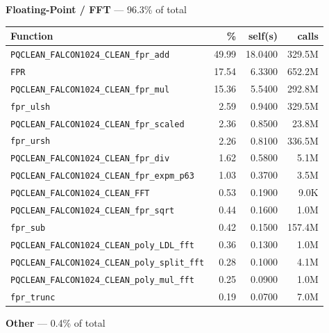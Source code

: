 \documentclass[11pt,a4paper]{article}
\begin{document}
\noindent\colorbox{fpcolor}{\strut \textbf{Floating-Point / FFT} --- 96.3\% of total}
\vspace{2pt}

\begin{longtable}{p{7.5cm}rrr}
\toprule
Function & \% & self(s) & calls \\
\midrule
\endhead
  \texttt{PQCLEAN\_FALCON1024\_CLEAN\_fpr\_add} & 49.99 & 18.0400 & 329.5M \\
  \texttt{FPR} & 17.54 & 6.3300 & 652.2M \\
  \texttt{PQCLEAN\_FALCON1024\_CLEAN\_fpr\_mul} & 15.36 & 5.5400 & 292.8M \\
  \texttt{fpr\_ulsh} & 2.59 & 0.9400 & 329.5M \\
  \texttt{PQCLEAN\_FALCON1024\_CLEAN\_fpr\_scaled} & 2.36 & 0.8500 & 23.8M \\
  \texttt{fpr\_ursh} & 2.26 & 0.8100 & 336.5M \\
  \texttt{PQCLEAN\_FALCON1024\_CLEAN\_fpr\_div} & 1.62 & 0.5800 & 5.1M \\
  \texttt{PQCLEAN\_FALCON1024\_CLEAN\_fpr\_expm\_p63} & 1.03 & 0.3700 & 3.5M \\
  \texttt{PQCLEAN\_FALCON1024\_CLEAN\_FFT} & 0.53 & 0.1900 & 9.0K \\
  \texttt{PQCLEAN\_FALCON1024\_CLEAN\_fpr\_sqrt} & 0.44 & 0.1600 & 1.0M \\
  \texttt{fpr\_sub} & 0.42 & 0.1500 & 157.4M \\
  \texttt{PQCLEAN\_FALCON1024\_CLEAN\_poly\_LDL\_fft} & 0.36 & 0.1300 & 1.0M \\
  \texttt{PQCLEAN\_FALCON1024\_CLEAN\_poly\_split\_fft} & 0.28 & 0.1000 & 4.1M \\
  \texttt{PQCLEAN\_FALCON1024\_CLEAN\_poly\_mul\_fft} & 0.25 & 0.0900 & 1.0M \\
  \texttt{fpr\_trunc} & 0.19 & 0.0700 & 7.0M \\
\bottomrule
\end{longtable}

\noindent\colorbox{othercolor}{\strut \textbf{Other} --- 0.4\% of total}
\vspace{2pt}
\end{document}
